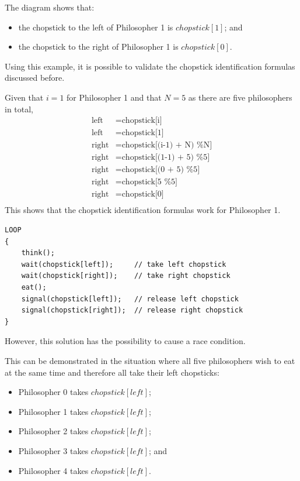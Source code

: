 \documentclass[a4paper]{systems-software}
\begin{document}
The diagram shows that:
\begin{itemize}
	\item the chopstick to the left of Philosopher 1 is $chopstick[1]$; and
	\item the chopstick to the right of Philosopher 1 is $chopstick[0]$.
\end{itemize}

Using this example, it is possible to validate the chopstick identification formulas discussed before.

Given that $i = 1$ for Philosopher 1 and that $N = 5$ as there are five philosophers in total,
\begin{equation*}
	\begin{aligned}
		\text{left} & = \text{chopstick[i]} \\
		\text{left} & = \text{chopstick[1]} \\
		\text{right} & = \text{chopstick[(i-1) + N) \% N]} \\
		\text{right} & = \text{chopstick[(1-1) + 5) \% 5]} \\
		\text{right} & = \text{chopstick[(0 + 5) \% 5]} \\
		\text{right} & = \text{chopstick[5 \% 5]} \\
		\text{right} & = \text{chopstick[0]} \\
	\end{aligned}
\end{equation*}
This shows that the chopstick identification formulas work for Philosopher 1.

\begin{lstlisting}[title={Producer class}]
LOOP
{
	think();
	wait(chopstick[left]);     // take left chopstick
	wait(chopstick[right]);    // take right chopstick
	eat();
	signal(chopstick[left]);   // release left chopstick
	signal(chopstick[right]);  // release right chopstick
}
\end{lstlisting}

However, this solution has the possibility to cause a race condition.

This can be demonstrated in the situation where all five philosophers wish to eat at the same time and therefore all take their left chopsticks:
\begin{itemize}
	\item Philosopher 0 takes $chopstick[left]$;
	\item Philosopher 1 takes $chopstick[left]$;
	\item Philosopher 2 takes $chopstick[left]$;
	\item Philosopher 3 takes $chopstick[left]$; and
	\item Philosopher 4 takes $chopstick[left]$.
\end{itemize}
\end{document}
